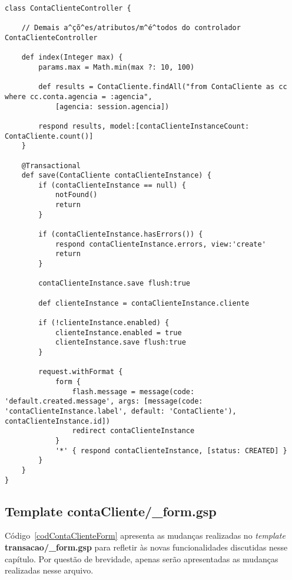 \begin{lstlisting}[caption=Controlador {\bf ContaClienteController}, frame=trBL,
    float=htbp, label=codContaClienteController2] 
class ContaClienteController {

    // Demais a^çõ^es/atributos/m^é^todos do controlador ContaClienteController

    def index(Integer max) {
        params.max = Math.min(max ?: 10, 100)
		
        def results = ContaCliente.findAll("from ContaCliente as cc where cc.conta.agencia = :agencia",
            [agencia: session.agencia])
		
        respond results, model:[contaClienteInstanceCount: ContaCliente.count()]
    }

    @Transactional
    def save(ContaCliente contaClienteInstance) {
        if (contaClienteInstance == null) {
            notFound()
            return
        }

        if (contaClienteInstance.hasErrors()) {
            respond contaClienteInstance.errors, view:'create'
            return
        }

        contaClienteInstance.save flush:true

        def clienteInstance = contaClienteInstance.cliente 

        if (!clienteInstance.enabled) {
            clienteInstance.enabled = true
            clienteInstance.save flush:true
        }
        
        request.withFormat {
            form {
                flash.message = message(code: 'default.created.message', args: [message(code: 'contaClienteInstance.label', default: 'ContaCliente'), contaClienteInstance.id])
                redirect contaClienteInstance
            }
            '*' { respond contaClienteInstance, [status: CREATED] }
        }
    }
}
\end{lstlisting}

\newpage

\subsection{Template contaCliente/\_form.gsp}

\vspace{0.5cm}

Código~\ref{codContaClienteForm}  apresenta  as   mudanças  realizadas  no  {\it
  template}  {\bf transacao/\_form.gsp} para  refletir às  novas funcionalidades
discutidas nesse  capítulo. Por questão de brevidade,  apenas serão apresentadas
as mudanças realizadas nesse arquivo.


